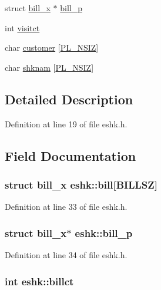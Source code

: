\begin{DoxyCompactItemize}
\item 
struct \hyperlink{structbill__x}{bill\+\_\+x} $\ast$ \hyperlink{structeshk_a119d3efc36fca4faee9258539802a0e5}{bill\+\_\+p}
\item 
int \hyperlink{structeshk_ab0bab205113220e61df9e8d2395540e1}{visitct}
\item 
char \hyperlink{structeshk_ae7ed241193a9bd4c4256a68a2fc1aa08}{customer} \mbox{[}\hyperlink{global_8h_a06d346f470496500184b39a3c9c4df9d}{P\+L\+\_\+\+N\+S\+I\+Z}\mbox{]}
\item 
char \hyperlink{structeshk_af7e8849c162c01c2a1366bb0511f2dbb}{shknam} \mbox{[}\hyperlink{global_8h_a06d346f470496500184b39a3c9c4df9d}{P\+L\+\_\+\+N\+S\+I\+Z}\mbox{]}
\end{DoxyCompactItemize}


\subsection{Detailed Description}


Definition at line 19 of file eshk.\+h.



\subsection{Field Documentation}
\hypertarget{structeshk_ab38dc2696d3a24ab5391b2fcd01df7c1}{
\subsubsection[{bill}]{\setlength{\rightskip}{0pt plus 5cm}struct {\bf bill\+\_\+x} eshk\+::bill\mbox{[}{\bf B\+I\+L\+L\+S\+Z}\mbox{]}}}\label{structeshk_ab38dc2696d3a24ab5391b2fcd01df7c1}


Definition at line 33 of file eshk.\+h.

\hypertarget{structeshk_a119d3efc36fca4faee9258539802a0e5}{
\subsubsection[{bill\+\_\+p}]{\setlength{\rightskip}{0pt plus 5cm}struct {\bf bill\+\_\+x}$\ast$ eshk\+::bill\+\_\+p}}\label{structeshk_a119d3efc36fca4faee9258539802a0e5}


Definition at line 34 of file eshk.\+h.

\hypertarget{structeshk_a308503dfea18102267b48e75db0c4615}{
\subsubsection[{billct}]{\setlength{\rightskip}{0pt plus 5cm}int eshk\+::billct}}\label{structeshk_a308503dfea18102267b48e75db0c4615}


